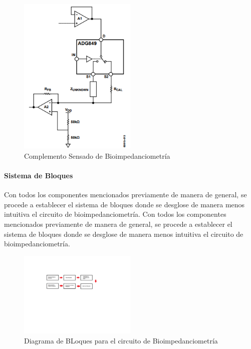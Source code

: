 \documentclass[12pt,letterpaper,spanish]{article}
\begin{document}
			\begin{figure}[H]
				\centering
				\includegraphics[width=0.5\textwidth]{./Imagenes/Anexo_Bio.png}
				\caption{Complemento Sensado de Bioimpedanciometría}
			\end{figure}
			
			\paragraph{Sistema de Bloques}
			\hfill\break
			Con todos los componentes mencionados previamente de manera de general, se procede a establecer el sistema de bloques donde se desglose de manera menos intuitiva el circuito de bioimpedanciometría. Con todos los componentes mencionados previamente de manera de general, se procede a establecer el sistema de bloques donde se desglose de manera menos intuitiva el circuito de bioimpedanciometría. 

			\begin{figure}[H]
				\centering
				\includegraphics[width=0.5\textwidth]{./Imagenes/Diagrama de Bloques.png}
				\caption{Diagrama de BLoques para el circuito de Bioimpedanciometría}
			\end{figure}			


				
\end{document}
